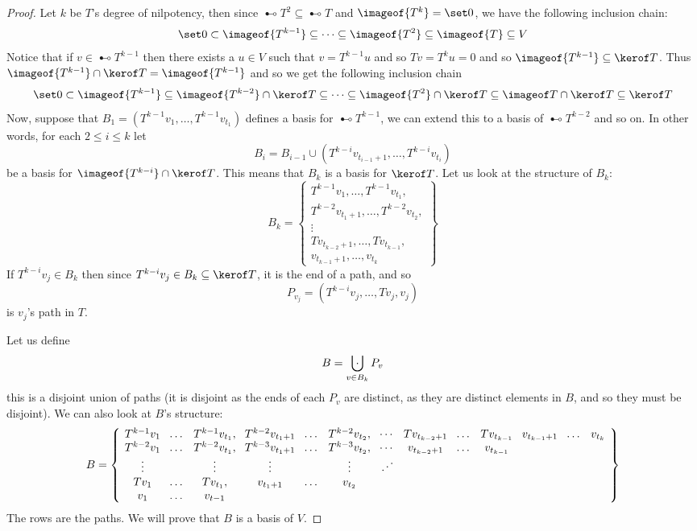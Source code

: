 \begin{proof}

    Let $k$ be $T$'s degree of nilpotency, then since $\imageof{T^2}\subseteq\imageof T$ and $\imageof{T^k}=\set0$, we have the following inclusion chain:
    \[ \set 0 \subset \imageof{T^{k-1}} \subseteq \cdots \subseteq \imageof{T^2} \subseteq \imageof{T} \subseteq V \]
    Notice that if $v\in\imageof{T^{k-1}}$ then there exists a $u\in V$ such that $v=T^{k-1}u$ and so $Tv=T^ku=0$ and so $\imageof{T^{k-1}}\subseteq\kerof T$.
    Thus $\imageof{T^{k-1}}\cap\kerof T=\imageof{T^{k-1}}$ and so we get the following inclusion chain
    \[ \set 0 \subset \imageof{T^{k-1}} \subseteq \imageof{T^{k-2}}\cap\kerof T \subseteq\cdots\subseteq \imageof{T^2}\cap\kerof T \subseteq \imageof T\cap\kerof T \subseteq \kerof T \]
    Now, suppose that $B_1=(T^{k-1}v_1,\dots,T^{k-1}v_{t_1})$ defines a basis for $\imageof{T^{k-1}}$, we can extend this to a basis of $\imageof{T^{k-2}}$ and so on.
    In other words, for each $2\leq i\leq k$ let
    \[ B_i = B_{i-1}\cup(T^{k-i}v_{t_{i-1}+1},\dots,T^{k-i}v_{t_i}) \]
    be a basis for $\imageof{T^{k-i}}\cap\kerof T$.
    This means that $B_k$ is a basis for $\kerof T$.
    Let us look at the structure of $B_k$:
    \[ B_k = \left\{ \begin{gathered}
    T^{k-1}v_1,\dots,T^{k-1}v_{t_1}, \\
    T^{k-2}v_{t_1+1},\dots,T^{k-2}v_{t_2}, \\
    \vdots \\
    Tv_{t_{k-2}+1},\dots,Tv_{t_{k-1}}, \\
    v_{t_{k-1}+1},\dots,v_{t_k}
    \end{gathered} \right\} \]
    If $T^{k-i}v_j\in B_k$ then since $T^{k-i}v_j\in B_k\subseteq\kerof T$, it is the end of a path, and so
    \[ P_{v_j} = (T^{k-i}v_j,\dots,Tv_j,v_j) \]
    is $v_j$'s path in $T$.

    Let us define
    \[ B = \bigdcup_{v\in B_k}P_v \]
    this is a disjoint union of paths (it is disjoint as the ends of each $P_v$ are distinct, as they are distinct elements in $B$, and so they must be disjoint).
    We can also look at $B$'s structure:
    \[ \def\arraycolsep{4pt}
    B = \left\{ \begin{array}{ccccccccccccc}
        T^{k-1}v_1&\dots&T^{k-1}v_{t_1}, & T^{k-2}v_{t_1+1}&\dots&T^{k-2}v_{t_2}, & \cdots & Tv_{t_{k-2}+1}&\dots&Tv_{t_{k-1}} & v_{t_{k-1}+1}&\dots&v_{t_k} \\
        T^{k-2}v_1&\dots&T^{k-2}v_{t_1}, & T^{k-3}v_{t_1+1}&\dots&T^{k-3}v_{t_2}, & \cdots & v_{t_{k-2}+1}&\dots&v_{t_{k-1}} \\
        \vdots&&\vdots&\vdots&&\vdots&\iddots\\
        Tv_1&\dots&Tv_{t_1}, & v_{t_1+1}&\dots&v_{t_2} \\
        v_1&\dots&v_{t-1}\\
    \end{array}\right\} \]
    The rows are the paths.
    We will prove that $B$ is a basis of $V$.


\end{proof}
